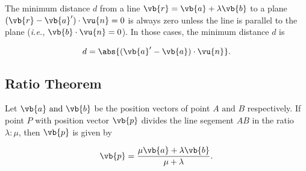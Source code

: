 \documentclass[a4paper,12pt]{report}
\begin{document}
The minimum distance \(d\) from a line \(\vb{r} = \vb{a} + \lambda \vb{b} \) to a plane \((\vb{r} - \vb{a} ')\cdot \vu{n} = 0\) is always zero unless the line is parallel to the plane (\textit{i.e.,} \(\vb{b} \cdot \vu{n} = 0\)). In those cases, the minimum distance \(d\) is 

\begin{equation}
    d = \abs{(\vb{a} ' - \vb{a} ) \cdot \vu{n} }. 
\end{equation}

\subsection{Ratio Theorem}

Let \(\vb{a} \text { and } \vb{b} \) be the position vectors of point \(A \text { and } B\) respectively. If point \(P\) with position vector \(\vb{p} \) divides the line segement \(AB\) in the ratio \(\lambda : \mu \), then \(\vb{p} \) is given by 

\begin{equation}
    \vb{p} = \frac{\mu \vb{a} + \lambda \vb{b} }{\mu + \lambda }. 
\end{equation}
\end{document}
